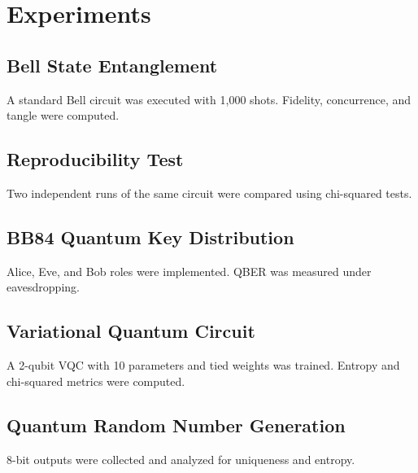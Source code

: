 \section{Experiments}

\subsection{Bell State Entanglement}
A standard Bell circuit was executed with 1,000 shots. Fidelity, concurrence, and tangle were computed.

\subsection{Reproducibility Test}
Two independent runs of the same circuit were compared using chi-squared tests.

\subsection{BB84 Quantum Key Distribution}
Alice, Eve, and Bob roles were implemented. QBER was measured under eavesdropping.

\subsection{Variational Quantum Circuit}
A 2-qubit VQC with 10 parameters and tied weights was trained. Entropy and chi-squared metrics were computed.

\subsection{Quantum Random Number Generation}
8-bit outputs were collected and analyzed for uniqueness and entropy.
